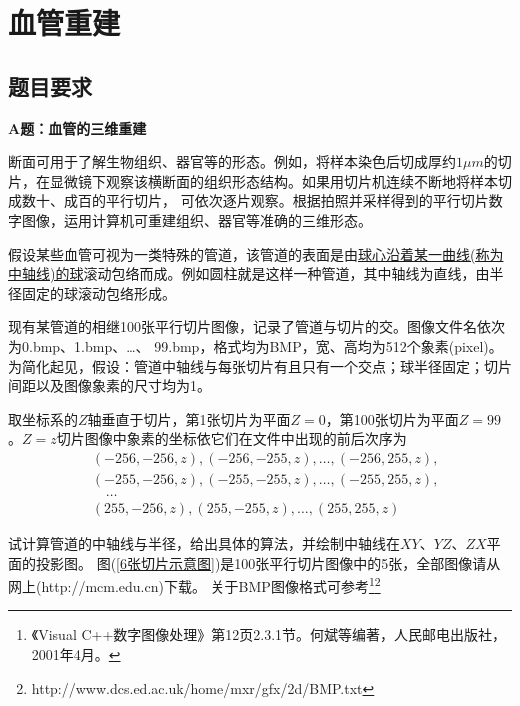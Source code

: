 % 
\chapter{血管重建}
\section{题目要求}
    \par
    \textbf{A题：血管的三维重建}
    \par
    断面可用于了解生物组织、器官等的形态。例如，将样本染色后切成厚约$1\mu m$的切片，在显微镜下观察该横断面的组织形态结构。如果用切片机连续不断地将样本切成数十、成百的平行切片， 可依次逐片观察。根据拍照并采样得到的平行切片数字图像，运用计算机可重建组织、器官等准确的三维形态。
    \par
    假设某些血管可视为一类特殊的管道，该管道的表面是由\uline{球心沿着某一曲线(称为中轴线)的球}滚动包络而成。例如圆柱就是这样一种管道，其中轴线为直线，由半径固定的球滚动包络形成。
    \par
    现有某管道的相继100张平行切片图像，记录了管道与切片的交。图像文件名依次为0.bmp、1.bmp、…、 99.bmp，格式均为BMP，宽、高均为512个象素(pixel)。为简化起见，假设：管道中轴线与每张切片有且只有一个交点；球半径固定；切片间距以及图像象素的尺寸均为1。
    \par
    取坐标系的$Z$轴垂直于切片，第1张切片为平面$Z=0$，第100张切片为平面$Z=99$。$Z=z$切片图像中象素的坐标依它们在文件中出现的前后次序为
    \begin{align*}
    & (-256,-256,z),(-256,-255,z),\dots,(-256,255,z),\\
    & (-255,-256,z),(-255,-255,z),\dots,(-255,255,z),\\
    & \quad \dots\\
    & ( 255,-256,z),( 255,-255,z),\dots,(255,255,z)
    \end{align*}
    \par
    试计算管道的中轴线与半径，给出具体的算法，并绘制中轴线在$XY$、$YZ$、$ZX$平面的投影图。
    图(\ref{6张切片示意图})是100张平行切片图像中的5张，全部图像请从网上(http://mcm.edu.cn)下载。
    关于BMP图像格式可参考\footnote{《Visual C++数字图像处理》第12页2.3.1节。何斌等编著，人民邮电出版社，2001年4月。}\footnote{http://www.dcs.ed.ac.uk/home/mxr/gfx/2d/BMP.txt}
